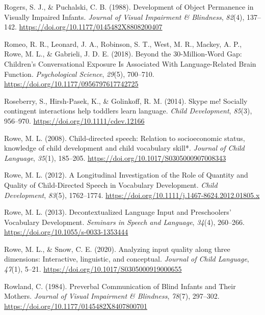 \documentclass[
  man]{apa6}
\newlength{\cslhangindent}
\newlength{\cslentryspacingunit} %
\newenvironment{CSLReferences}[2] %
 {%
  \setlength{\parindent}{0pt}
  \ifodd #1
  \let\oldpar\par
  \def\par{\hangindent=\cslhangindent\oldpar}
  \fi
  \setlength{\parskip}{#2\cslentryspacingunit}
 }%
 {}
\begin{document}
\begin{CSLReferences}{1}{0}
\leavevmode{}%
Rogers, S. J., \& Puchalski, C. B. (1988). Development of {Object} {Permanence} in {Visually} {Impaired} {Infants}. \emph{Journal of Visual Impairment \& Blindness}, \emph{82}(4), 137--142. \url{https://doi.org/10.1177/0145482X8808200407}

\leavevmode{}%
Romeo, R. R., Leonard, J. A., Robinson, S. T., West, M. R., Mackey, A. P., Rowe, M. L., \& Gabrieli, J. D. E. (2018). Beyond the 30-{Million}-{Word} {Gap}: {Children}'s {Conversational} {Exposure} {Is} {Associated} {With} {Language}-{Related} {Brain} {Function}. \emph{Psychological Science}, \emph{29}(5), 700--710. \url{https://doi.org/10.1177/0956797617742725}

\leavevmode{}%
Roseberry, S., Hirsh-Pasek, K., \& Golinkoff, R. M. (2014). Skype me! {Socially} contingent interactions help toddlers learn language. \emph{Child Development}, \emph{85}(3), 956--970. \url{https://doi.org/10.1111/cdev.12166}

\leavevmode{}%
Rowe, M. L. (2008). Child-directed speech: Relation to socioeconomic status, knowledge of child development and child vocabulary skill*. \emph{Journal of Child Language}, \emph{35}(1), 185--205. \url{https://doi.org/10.1017/S0305000907008343}

\leavevmode{}%
Rowe, M. L. (2012). A {Longitudinal} {Investigation} of the {Role} of {Quantity} and {Quality} of {Child}-{Directed} {Speech} in {Vocabulary} {Development}. \emph{Child Development}, \emph{83}(5), 1762--1774. \url{https://doi.org/10.1111/j.1467-8624.2012.01805.x}

\leavevmode{}%
Rowe, M. L. (2013). Decontextualized {Language} {Input} and {Preschoolers}' {Vocabulary} {Development}. \emph{Seminars in Speech and Language}, \emph{34}(4), 260--266. \url{https://doi.org/10.1055/s-0033-1353444}

\leavevmode{}%
Rowe, M. L., \& Snow, C. E. (2020). Analyzing input quality along three dimensions: Interactive, linguistic, and conceptual. \emph{Journal of Child Language}, \emph{47}(1), 5--21. \url{https://doi.org/10.1017/S0305000919000655}

\leavevmode{}%
Rowland, C. (1984). Preverbal {Communication} of {Blind} {Infants} and {Their} {Mothers}. \emph{Journal of Visual Impairment \& Blindness}, \emph{78}(7), 297--302. \url{https://doi.org/10.1177/0145482X8407800701}


\end{CSLReferences}
\end{document}

